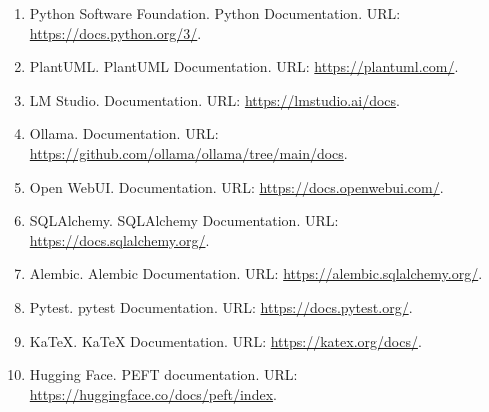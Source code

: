 \documentclass[12pt,a4paper]{article}
\begin{document}
\begin{enumerate}
  \item Python Software Foundation. Python Documentation. URL: \url{https://docs.python.org/3/}.
  \item PlantUML. PlantUML Documentation. URL: \url{https://plantuml.com/}.
  \item LM Studio. Documentation. URL: \url{https://lmstudio.ai/docs}.
  \item Ollama. Documentation. URL: \url{https://github.com/ollama/ollama/tree/main/docs}.
  \item Open WebUI. Documentation. URL: \url{https://docs.openwebui.com/}.
  \item SQLAlchemy. SQLAlchemy Documentation. URL: \url{https://docs.sqlalchemy.org/}.
  \item Alembic. Alembic Documentation. URL: \url{https://alembic.sqlalchemy.org/}.
  \item Pytest. pytest Documentation. URL: \url{https://docs.pytest.org/}.
  \item KaTeX. KaTeX Documentation. URL: \url{https://katex.org/docs/}.
  \item Hugging Face. PEFT documentation. URL: \url{https://huggingface.co/docs/peft/index}.
\end{enumerate}
\endgroup


\end{document}
